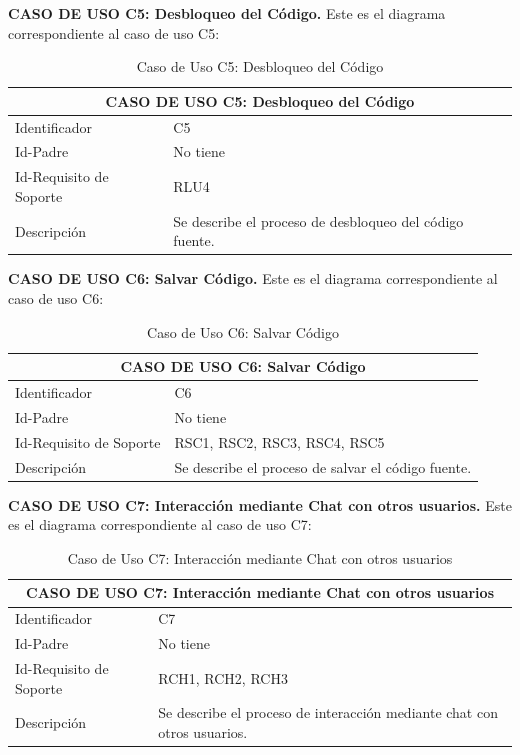\vspace{2cm}

\textbf{CASO DE USO C5: Desbloqueo del Código.} Este es el diagrama correspondiente al caso de uso C5:

\begin{table}[h]
\centering
\begin{tabular}{ | p{} | p{} | }
	\hline
	\multicolumn{2}{|c|}{CASO DE USO C5: Desbloqueo del Código} \\
	\hline
	Identificador  & C5 \\
	\hline 
	Id-Padre & No tiene \\
	\hline
	Id-Requisito de Soporte & RLU4 \\
	\hline
	Descripción & Se describe el proceso de desbloqueo del código fuente. \\
	\hline
\end{tabular}
\caption{Caso de Uso C5: Desbloqueo del Código}
\end{table}

\newpage

\textbf{CASO DE USO C6: Salvar Código.} Este es el diagrama correspondiente al caso de uso C6:

\begin{table}[h]
\centering
\begin{tabular}{ | p{} | p{} | }
	\hline
	\multicolumn{2}{|c|}{CASO DE USO C6: Salvar Código} \\
	\hline
	Identificador  & C6 \\
	\hline 
	Id-Padre & No tiene \\
	\hline
	Id-Requisito de Soporte & RSC1, RSC2, RSC3, RSC4, RSC5 \\
	\hline
	Descripción & Se describe el proceso de salvar el código fuente. \\
	\hline
\end{tabular}
\caption{Caso de Uso C6: Salvar Código}
\end{table}

\vspace{2cm}

\textbf{CASO DE USO C7: Interacción mediante Chat con otros usuarios.} Este es el diagrama correspondiente al caso de uso C7:

\begin{table}[h]
\centering
\begin{tabular}{ | p{} | p{} | }
	\hline
	\multicolumn{2}{|c|}{CASO DE USO C7: Interacción mediante Chat con otros usuarios} \\
	\hline
	Identificador  & C7 \\
	\hline 
	Id-Padre & No tiene \\
	\hline
	Id-Requisito de Soporte & RCH1, RCH2, RCH3 \\
	\hline
	Descripción & Se describe el proceso de interacción mediante chat con otros usuarios. \\
	\hline
\end{tabular}
\caption{Caso de Uso C7: Interacción mediante Chat con otros usuarios}
\end{table}

